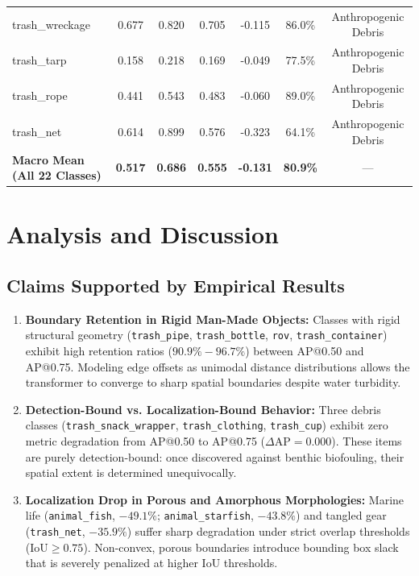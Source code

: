 \documentclass[conference]{IEEEtran}
\begin{document}
\begin{table}[t]
\begin{tabular}{lcccccc}
trash\_wreckage & 0.677 & 0.820 & 0.705 & -0.115 & 86.0\% & Anthropogenic Debris \\
trash\_tarp & 0.158 & 0.218 & 0.169 & -0.049 & 77.5\% & Anthropogenic Debris \\
trash\_rope & 0.441 & 0.543 & 0.483 & -0.060 & 89.0\% & Anthropogenic Debris \\
trash\_net & 0.614 & 0.899 & 0.576 & -0.323 & 64.1\% & Anthropogenic Debris \\
\midrule
\textbf{Macro Mean (All 22 Classes)} & \textbf{0.517} & \textbf{0.686} & \textbf{0.555} & \textbf{-0.131} & \textbf{80.9\%} & --- \\
\bottomrule
\end{tabular}
\end{table}

\section{Analysis and Discussion}

\subsection{Claims Supported by Empirical Results}
\begin{enumerate}
    \item \textbf{Boundary Retention in Rigid Man-Made Objects:} Classes with rigid structural geometry (\texttt{trash\_pipe}, \texttt{trash\_bottle}, \texttt{rov}, \texttt{trash\_container}) exhibit high retention ratios ($90.9\% - 96.7\%$) between AP@0.50 and AP@0.75. Modeling edge offsets as unimodal distance distributions allows the transformer to converge to sharp spatial boundaries despite water turbidity.
    \item \textbf{Detection-Bound vs. Localization-Bound Behavior:} Three debris classes (\texttt{trash\_snack\_wrapper}, \texttt{trash\_clothing}, \texttt{trash\_cup}) exhibit zero metric degradation from AP@0.50 to AP@0.75 ($\Delta\text{AP} = 0.000$). These items are purely detection-bound: once discovered against benthic biofouling, their spatial extent is determined unequivocally.
    \item \textbf{Localization Drop in Porous and Amorphous Morphologies:} Marine life (\texttt{animal\_fish}, $-49.1\%$; \texttt{animal\_starfish}, $-43.8\%$) and tangled gear (\texttt{trash\_net}, $-35.9\%$) suffer sharp degradation under strict overlap thresholds ($\text{IoU} \ge 0.75$). Non-convex, porous boundaries introduce bounding box slack that is severely penalized at higher IoU thresholds.
\end{enumerate}
\end{document}
